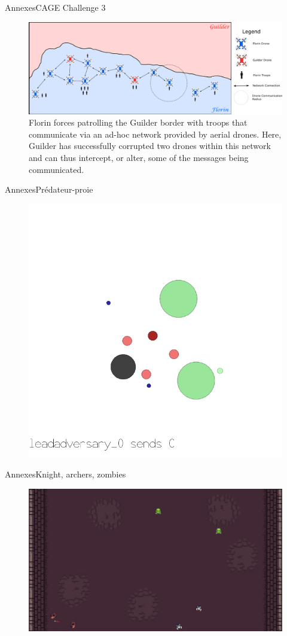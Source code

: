 \begin{frame}{Annexes}{CAGE Challenge 3}
    \begin{figure}
        \includegraphics[width=0.9\linewidth]{figures/cage_challenge_3.png}
        \caption*{Florin forces patrolling the Guilder border with troops that communicate via an ad-hoc network provided by aerial drones. Here, Guilder has successfully corrupted two drones within this network and can thus intercept, or alter, some of the messages being communicated.}
    \end{figure}
\end{frame}

\begin{frame}{Annexes}{Prédateur-proie}
    \begin{figure}
        \includegraphics[width=0.5\linewidth]{figures/mpe_simple_world_comm.png}
    \end{figure}
\end{frame}

\begin{frame}{Annexes}{Knight, archers, zombies}
    \begin{figure}
        \includegraphics[width=0.8\linewidth]{figures/butterfly_knights_archers_zombies.png}
    \end{figure}
\end{frame}


